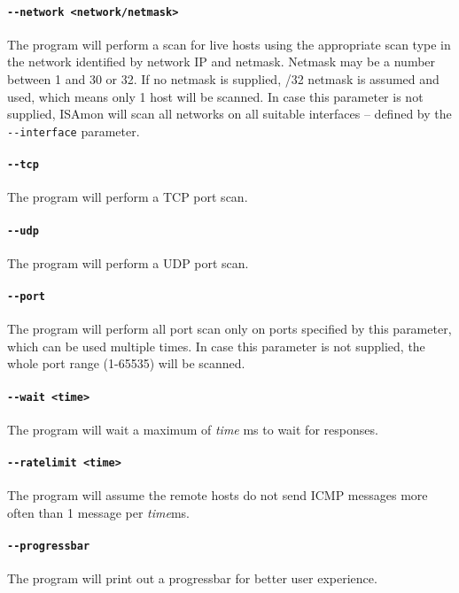 \documentclass[11pt,a4paper]{article}
\begin{document}
		\paragraph{\texttt{-{}-network <network/netmask>}} The program will perform a scan for live hosts using the appropriate scan type in the network identified by network IP and netmask. Netmask may be a number between 1 and 30 or 32. If no netmask is supplied, /32 netmask is assumed and used, which means only 1 host will be scanned. In case this parameter is not supplied, ISAmon will scan all networks on all suitable interfaces -- defined by the \texttt{-{}-interface} parameter.
		\vspace{-0.5cm}
		\paragraph{\texttt{-{}-tcp}} The program will perform a TCP port scan.
		\vspace{-0.5cm}
		\paragraph{\texttt{-{}-udp}} The program will perform a UDP port scan.
		\vspace{-0.5cm}
		\paragraph{\texttt{-{}-port}} The program will perform all port scan only on ports specified by this parameter, which can be used multiple times. In case this parameter is not supplied, the whole port range (1-65535) will be scanned.
		\vspace{-0.5cm}
		\paragraph{\texttt{-{}-wait <time>}} The program will wait a maximum of \emph{time} ms to wait for responses.
		\vspace{-0.5cm}
		\paragraph{\texttt{-{}-ratelimit <time>}} The program will assume the remote hosts do not send ICMP messages more often than 1 message per \emph{time}ms.
		\paragraph{\texttt{-{}-progressbar}} The program will print out a progressbar for better user experience.
\end{document}
